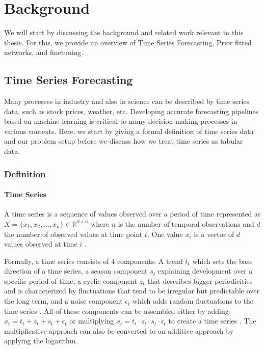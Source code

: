 \chapter{Background}
\label{chap:background}
We will start by discussing the background and related work relevant to this thesis.
For this, we provide an overview of Time Series Forecasting, Prior fitted networks, and finetuning.
\section{Time Series Forecasting}
\label{sec:timeseriesforecasting}
Many processes in industry and also in science can be described by time series data, such as stock prices, weather, etc.
Developing accurate forecasting pipelines based on machine learning is critical to many decision-making processes in various contexts.
Here, we start by giving a formal definition of time series data and our problem setup before we discuss how we treat time series as tabular data.
\subsection{Definition}
\subsubsection{Time Series}
A time series is a sequence of values observed over a period of time represented as $X=\{x_1, x_2, …, x_n\} \in \mathbb{R}^{d \times n}$ where $n$ is the number of temporal observations and $d$ the number of observed values at time point $t$.
One value $x_i$ is a vector of $d$ values observed at time $i$ \citep{wang2024deep}.

Formally, a time series consists of 4 components: A trend $t_t$ which sets the base direction of a time series,
a season component $s_t$ explaining development over a specific period of time,
a cyclic component $z_t$ that describes bigger periodicities and is characterized by fluctuations that tend to be irregular but predictable over the long term,
and a noise component $\epsilon_t$ which adds random fluctuations to the time series \citep{liu2024deep}.
All of these components can be assembled either by adding $x_t = t_t + z_t + s_t + \epsilon_t$ or multiplying $x_t = t_t \cdot z_t \cdot s_t \cdot \epsilon_t$ to create a time series \citep{Dagum2006}.
The multiplicative approach can also be converted to an additive approach by applying the logarithm.
